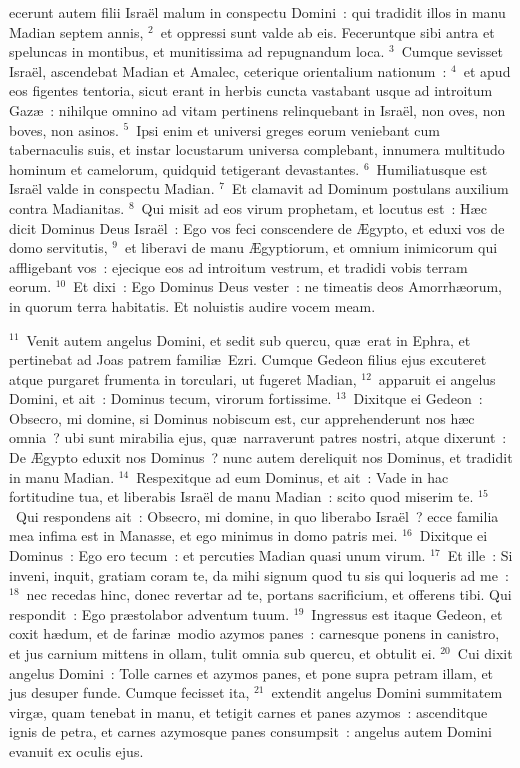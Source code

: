 \bchapter
{}ecerunt autem filii Isra\"el malum in conspectu Domini~: qui tradidit illos in manu Madian septem annis,
${}^{2}$~et oppressi sunt valde ab eis. Feceruntque sibi antra et speluncas in montibus, et munitissima ad repugnandum loca.
${}^{3}$~Cumque sevisset Isra\"el, ascendebat Madian et Amalec, ceterique orientalium nationum~:
${}^{4}$~et apud eos figentes tentoria, sicut erant in herbis cuncta vastabant usque ad introitum Gaz\ae~: nihilque omnino ad vitam pertinens relinquebant in Isra\"el, non oves, non boves, non asinos.
${}^{5}$~Ipsi enim et universi greges eorum veniebant cum tabernaculis suis, et instar locustarum universa complebant, innumera multitudo hominum et camelorum, quidquid tetigerant devastantes.
${}^{6}$~Humiliatusque est Isra\"el valde in conspectu Madian.
${}^{7}$~Et clamavit ad Dominum postulans auxilium contra Madianitas.
${}^{8}$~Qui misit ad eos virum prophetam, et locutus est~: H\ae c dicit Dominus Deus Isra\"el~: Ego vos feci conscendere de \AE gypto, et eduxi vos de domo servitutis,
${}^{9}$~et liberavi de manu \AE gyptiorum, et omnium inimicorum qui affligebant vos~: ejecique eos ad introitum vestrum, et tradidi vobis terram eorum.
${}^{10}$~Et dixi~: Ego Dominus Deus vester~: ne timeatis deos Amorrh\ae orum, in quorum terra habitatis. Et noluistis audire vocem meam.


${}^{11}$~Venit autem angelus Domini, et sedit sub quercu, qu\ae\ erat in Ephra, et pertinebat ad Joas patrem famili\ae\ Ezri. Cumque Gedeon filius ejus excuteret atque purgaret frumenta in torculari, ut fugeret Madian,
${}^{12}$~apparuit ei angelus Domini, et ait~: Dominus tecum, virorum fortissime.
${}^{13}$~Dixitque ei Gedeon~: Obsecro, mi domine, si Dominus nobiscum est, cur apprehenderunt nos h\ae c omnia~? ubi sunt mirabilia ejus, qu\ae\ narraverunt patres nostri, atque dixerunt~: De \AE gypto eduxit nos Dominus~? nunc autem dereliquit nos Dominus, et tradidit in manu Madian.
${}^{14}$~Respexitque ad eum Dominus, et ait~: Vade in hac fortitudine tua, et liberabis Isra\"el de manu Madian~: scito quod miserim te.
${}^{15}$~Qui respondens ait~: Obsecro, mi domine, in quo liberabo Isra\"el~? ecce familia mea infima est in Manasse, et ego minimus in domo patris mei.
${}^{16}$~Dixitque ei Dominus~: Ego ero tecum~: et percuties Madian quasi unum virum.
${}^{17}$~Et ille~: Si inveni, inquit, gratiam coram te, da mihi signum quod tu sis qui loqueris ad me~:
${}^{18}$~nec recedas hinc, donec revertar ad te, portans sacrificium, et offerens tibi. Qui respondit~: Ego pr\ae stolabor adventum tuum.
${}^{19}$~Ingressus est itaque Gedeon, et coxit h\ae dum, et de farin\ae\ modio azymos panes~: carnesque ponens in canistro, et jus carnium mittens in ollam, tulit omnia sub quercu, et obtulit ei.
${}^{20}$~Cui dixit angelus Domini~: Tolle carnes et azymos panes, et pone supra petram illam, et jus desuper funde. Cumque fecisset ita,
${}^{21}$~extendit angelus Domini summitatem virg\ae , quam tenebat in manu, et tetigit carnes et panes azymos~: ascenditque ignis de petra, et carnes azymosque panes consumpsit~: angelus autem Domini evanuit ex oculis ejus.


